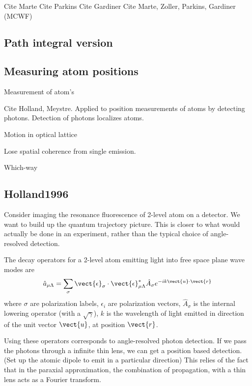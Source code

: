 Cite Marte
Cite Parkins  
Cite Gardiner \cite{Gardiner1992}
Cite Marte, Zoller, Parkins, Gardiner (MCWF) \cite{Dalibard1992}
\cite{Dum1992}

\subsection{Path integral version}


\subsection{Measuring atom positions}

Measurement of atom's\cite{Caves1987}


 Cite Holland, Meystre.  Applied to position measurements of atoms by detecting photons.  Detection of photons localizes atoms.  
\cite{Holland1996}

Motion in optical lattice
\cite{Greenwood1997}

Lose spatial coherence from single emission.
\cite{Pfau1994}

Which-way \cite{Gagen1993}


\subsection{Holland1996}

Consider imaging the resonance fluorescence of 2-level atom on a detector.  We want 
to build up the quantum trajectory picture.  
This is closer to what would actually be done in an experiment, rather than the typical
choice of angle-resolved detection.  

The decay operators for a 2-level atom emitting light into free space  plane wave modes are
\begin{equation}
  \hat{a}_{\mu\Lambda} = \sum_\sigma\vect{\epsilon}_\sigma\cdot\vect{\epsilon}^*_{\mu\Lambda}
  \hat{A}_\sigma e^{-ik\vect{u}\cdot\vect{r}}
\end{equation}
where $\sigma$ are polarization labels, $\epsilon_i$ are polarization vectors, $\hat{A}_\sigma$
is the internal lowering operator (with a $\sqrt{\gamma}$), $k$ is the wavelength of light emitted
in direction of the unit vector $\vect{u}$, at position $\vect{r}$.  

Using these operators corresponds to angle-resolved photon detection.  
If we pass the photons through a infinite thin lens, we can get a position based detection.
(Set up the atomic dipole to emit in a particular direction)
This relies of the fact that in the paraxial approximation, 
the combination of propagation, with a thin lens acts as a Fourier transform.
